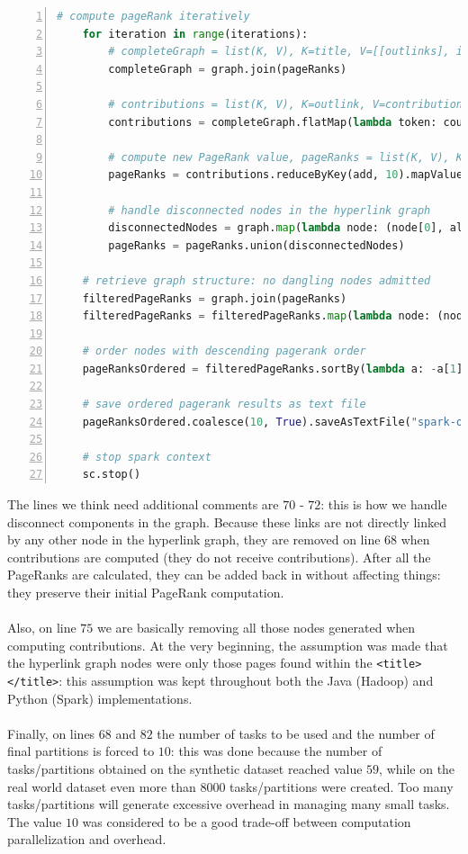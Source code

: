 \documentclass[11pt,a4paper]{article}
\begin{document}
\begin{lstlisting}[language=python,numbers=left,basicstyle=\tiny]
    # compute pageRank iteratively
    for iteration in range(iterations):
        # completeGraph = list(K, V), K=title, V=[[outlinks], initialPageRank]
        completeGraph = graph.join(pageRanks)

        # contributions = list(K, V), K=outlink, V=contribution
        contributions = completeGraph.flatMap(lambda token: countContributions(token[1][0], token[1][1]))

        # compute new PageRank value, pageRanks = list(K, V), K=outlink, V=PageRank
        pageRanks = contributions.reduceByKey(add, 10).mapValues(lambda sum: alfa*(1/float(broadcastN.value)) + (1 - alfa)*sum)

        # handle disconnected nodes in the hyperlink graph
        disconnectedNodes = graph.map(lambda node: (node[0], alfa*(1/float(broadcastN.value)))).subtractByKey(pageRanks)
        pageRanks = pageRanks.union(disconnectedNodes)

    # retrieve graph structure: no dangling nodes admitted
    filteredPageRanks = graph.join(pageRanks)
    filteredPageRanks = filteredPageRanks.map(lambda node: (node[0], node[1][1]))

    # order nodes with descending pagerank order
    pageRanksOrdered = filteredPageRanks.sortBy(lambda a: -a[1])

    # save ordered pagerank results as text file
    pageRanksOrdered.coalesce(10, True).saveAsTextFile("spark-output")

    # stop spark context
    sc.stop()
\end{lstlisting}
The lines we think need additional comments are $70$ - $72$: this is how we handle disconnect components in the graph. Because these links are not directly linked by any other node in the hyperlink graph, they are removed on line $68$ when contributions are computed (they do not receive contributions). After all the PageRanks are calculated, they can be added back in without affecting things: they preserve their initial PageRank computation.\\
\\
Also, on line $75$ we are basically removing all those nodes generated when computing contributions. At the very beginning, the assumption was made that the hyperlink graph nodes were only those pages found within the \texttt{<title></title>}: this assumption was kept throughout both the Java (Hadoop) and Python (Spark) implementations.\\
\\
Finally, on lines $68$ and $82$ the number of tasks to be used and the number of final partitions is forced to $10$: this was done because the number of tasks/partitions obtained on the synthetic dataset reached value $59$, while on the real world dataset even more than $8000$ tasks/partitions were created. Too many tasks/partitions will generate excessive overhead in managing many small tasks. The value $10$ was considered to be a good trade-off between computation parallelization and overhead.\\
\end{document}
